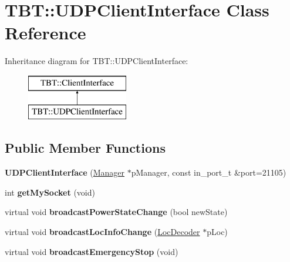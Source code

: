 \hypertarget{classTBT_1_1UDPClientInterface}{}\section{T\+BT\+:\+:U\+D\+P\+Client\+Interface Class Reference}
\label{classTBT_1_1UDPClientInterface}
Inheritance diagram for T\+BT\+:\+:U\+D\+P\+Client\+Interface\+:\begin{figure}[H]
\begin{center}
\leavevmode
\includegraphics[height=2.000000cm]{classTBT_1_1UDPClientInterface}
\end{center}
\end{figure}
\subsection*{Public Member Functions}
\begin{DoxyCompactItemize}
\item 
\mbox{\label{classTBT_1_1UDPClientInterface_ad03356f6abf16596c181851e9fcaf7a9}} 
{\bfseries U\+D\+P\+Client\+Interface} (\hyperlink{classTBT_1_1Manager}{Manager} $\ast$p\+Manager, const in\+\_\+port\+\_\+t \&port=21105)
\item 
\mbox{\label{classTBT_1_1UDPClientInterface_ac25b06823d045631f3c7b76e9c50f22e}} 
int {\bfseries get\+My\+Socket} (void)
\item 
\mbox{\label{classTBT_1_1UDPClientInterface_a60ddc3657a12b4e6c7ef7db0a31c9e3c}} 
virtual void {\bfseries broadcast\+Power\+State\+Change} (bool new\+State)
\item 
\mbox{\label{classTBT_1_1UDPClientInterface_af4e63115b3156b151d4dfd50342b36e7}} 
virtual void {\bfseries broadcast\+Loc\+Info\+Change} (\hyperlink{classTBT_1_1LocDecoder}{Loc\+Decoder} $\ast$p\+Loc)
\item 
\mbox{\label{classTBT_1_1UDPClientInterface_a33a0c51d141a457cda9dacc4d82d5304}} 
virtual void {\bfseries broadcast\+Emergency\+Stop} (void)
\end{DoxyCompactItemize}
